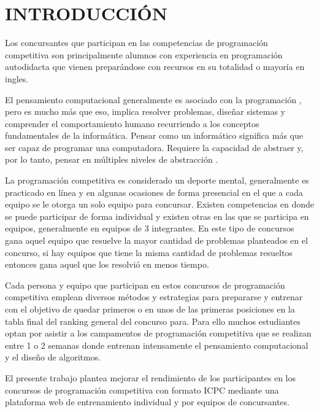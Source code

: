 \section{INTRODUCCIÓN}

Los concursantes que participan en las competencias de programación competitiva son principalmente alumnos con experiencia en programación autodidacta que vienen preparándose con recursos en su totalidad o mayoría en ingles.


El pensamiento computacional generalmente es asociado con la programación , pero es mucho más que eso, implica resolver problemas, diseñar sistemas y comprender el comportamiento humano recurriendo a los conceptos fundamentales de la informática. Pensar como un informático significa más que ser capaz de programar una computadora. Requiere la capacidad de abstraer y, por lo tanto, pensar en múltiples niveles de abstracción \citep{Wing}.

La programación competitiva es considerado un deporte mental, generalmente es practicado en línea y en algunas ocasiones de forma presencial en el que a cada equipo se le otorga un solo equipo para concursar. Existen competencias en donde se puede participar de forma individual y existen otras en las que se participa en equipos, generalmente en equipos de 3 integrantes. En este tipo de concursos gana aquel equipo que resuelve la mayor cantidad de problemas planteados en el concurso, si hay equipos que tiene la misma cantidad de problemas resueltos entonces gana aquel que los resolvió en menos tiempo. 

Cada persona y equipo que participan en estos concursos de programación competitiva emplean diversos métodos y estrategias para prepararse y entrenar con el objetivo de quedar primeros o en unos de las primeras posiciones en la tabla final del ranking general del concurso para. Para ello muchos estudiantes optan por asistir a los campamentos de programación competitiva que se realizan entre 1 o 2 semanas donde entrenan intensamente el pensamiento computacional y el diseño de algoritmos.

El presente trabajo plantea mejorar el rendimiento de los participantes en los concursos de programación competitiva con formato ICPC mediante una plataforma web de entrenamiento individual y por equipos de concursantes.
